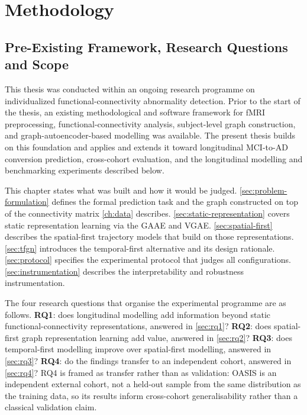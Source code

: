 
\chapter{Methodology}\label{ch:methodology}


\section{Pre-Existing Framework, Research Questions and Scope}\label{sec:preexisting}

This thesis was conducted within an ongoing research programme on individualized
functional-connectivity abnormality detection. Prior to the start of the thesis, an
existing methodological and software framework for \ac{fMRI} preprocessing,
functional-connectivity analysis, subject-level graph construction, and
graph-autoencoder-based modelling was available. The present thesis builds on this
foundation and applies and extends it toward longitudinal \ac{MCI}-to-\ac{AD} conversion
prediction, cross-cohort evaluation, and the longitudinal modelling and benchmarking
experiments described below.

This chapter states what was built and how it would be judged.
\autoref{sec:problem-formulation} defines the formal prediction task and the graph
constructed on top of the connectivity matrix \autoref{ch:data} describes.
\autoref{sec:static-representation} covers static representation learning via the
\ac{GAAE} and \ac{VGAE}. \autoref{sec:spatial-first} describes the spatial-first
trajectory models that build on those representations. \autoref{sec:tfgn} introduces the
temporal-first alternative and its design rationale. \autoref{sec:protocol} specifies the
experimental protocol that judges all configurations. \autoref{sec:instrumentation} describes the
interpretability and robustness instrumentation.

The four research questions that organise the experimental programme are as follows.
\textbf{RQ1}: does longitudinal modelling add information beyond static
functional-connectivity representations, answered in \autoref{sec:rq1}?
\textbf{RQ2}: does spatial-first graph representation learning add value, answered in
\autoref{sec:rq2}?
\textbf{RQ3}: does temporal-first modelling improve over spatial-first modelling, answered
in \autoref{sec:rq3}?
\textbf{RQ4}: do the findings transfer to an independent cohort, answered in
\autoref{sec:rq4}?
RQ4 is framed as transfer rather than as validation: \ac{OASIS} is an independent
external cohort, not a held-out sample from the same distribution as the training data,
so its results inform cross-cohort generalisability rather than a classical validation claim.

